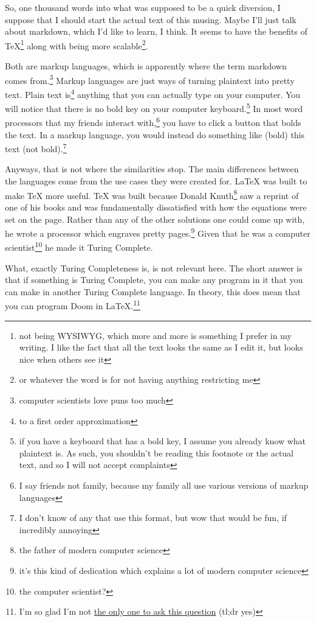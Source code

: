 \documentclass[12pt]{article}[titlepage]
\newcommand{\1}{\={a}}
\newcommand{\2}{\={e}}
\newcommand{\3}{\={\i}}
\newcommand{\4}{\=o}
\newcommand{\5}{\=u}
\newcommand{\6}{\={A}}
\renewcommand{\,}{\textsuperscript{,}}
\begin{document}
So, one thousand words into what was supposed to be a quick diversion, I suppose that I should start the actual text of this musing.
Maybe I'll just talk about markdown, which I'd like to learn, I think.
It seems to have the benefits of TeX\footnote{not being WYSIWYG, which more and more is something I prefer in my writing. I like the fact that all the text looks the same as I edit it, but looks nice when others see it} along with being more scalable\footnote{or whatever the word is for not having anything restricting me}.

Both are markup languages, which is apparently where the term markdown comes from.\footnote{computer scientists love puns too much}
Markup languages are just ways of turning plaintext into pretty text.
Plain text is\footnote{to a first order approximation} anything that you can actually type on your computer.
You will notice that there is no bold key on your computer keyboard.\footnote{if you have a keyboard that has a bold key, I assume you already know what plaintext is. As such, you shouldn't be reading this footnote or the actual text, and so I will not accept complaints}
In most word processors that my friends interact with,\footnote{I say friends not family, because my family all use various versions of markup languages} you have to click a button that bolds the text.
In a markup language, you would instead do something like (bold) this text (not bold).\footnote{I don't know of any that use this format, but wow that would be fun, if incredibly annoying}

Anyways, that is not where the similarities stop.
The main differences between the languages come from the use cases they were created for.
LaTeX was built to make TeX more useful.
TeX was built because Donald Knuth\footnote{the father of modern computer science} saw a reprint of one of his books and was fundamentally dissatisfied with how the equations were set on the page.
Rather than any of the other solutions one could come up with, he wrote a processor which engraves pretty pages.\footnote{it's this kind of dedication which explains a lot of modern computer science}
Given that he was a computer scientist\footnote{the computer scientist?} he made it Turing Complete.

What, exactly Turing Completeness is, is not relevant here.
The short answer is that if something is Turing Complete, you can make any program in it that you can make in another Turing Complete language.
In theory, this does mean that you can program Doom in LaTeX.\footnote{I'm so glad I'm not \href{https://tex.stackexchange.com/questions/649019/could-tex-run-doom}{the only one to ask this question} (tl;dr yes)}
\end{document}
